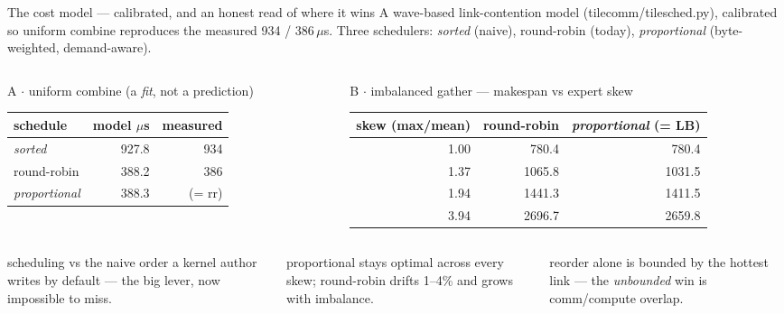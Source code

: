 \documentclass[pdf,aspectratio=169]{beamer}
\newcommand{\empy}[1]{{\color{darkorange}\emph{#1}}}
\newcommand{\empr}[1]{{\color{cardinalred}\emph{#1}}}
\newcommand{\examplebox}[2]{%
\begin{tcolorbox}[colframe=darkcardinal,colback=boxgray,title={#1}]
#2
\end{tcolorbox}}
\newcommand{\mc}[1]{{\ttfamily\small #1}}
\begin{document}
\begin{frame}{The cost model --- calibrated, and an honest read of where it wins}
\footnotesize
A wave-based link-contention model (\mc{tilecomm/tilesched.py}), calibrated so uniform combine reproduces the measured 934 / 386\,$\mu$s. Three schedulers: \empr{sorted} (naive), round-robin (today), \empy{proportional} (byte-weighted, demand-aware).
\begin{columns}
\begin{column}{0.45\textwidth}
\centering\scriptsize A $\cdot$ uniform combine (a \emph{fit}, not a prediction)
\begin{tabular}{lrr}
\toprule
schedule & model $\mu$s & measured \\
\midrule
\empr{sorted} & 927.8 & 934 \\
round-robin & 388.2 & 386 \\
\empy{proportional} & 388.3 & (= rr) \\
\bottomrule
\end{tabular}
\end{column}
\begin{column}{0.55\textwidth}
\centering\scriptsize B $\cdot$ imbalanced gather --- makespan vs expert skew
\begin{tabular}{rrr}
\toprule
skew (max/mean) & round-robin & \empy{proportional} (= LB) \\
\midrule
1.00 & 780.4 & 780.4 \\
1.37 & 1065.8 & 1031.5 \\
1.94 & 1441.3 & 1411.5 \\
3.94 & 2696.7 & 2659.8 \\
\bottomrule
\end{tabular}
\end{column}
\end{columns}
\vspace{0.5ex}
\begin{columns}
\begin{column}{0.33\textwidth}
\examplebox{2.4--6$\times$}{\scriptsize scheduling vs the naive order a kernel author writes by default --- the big lever, now impossible to miss.}
\end{column}
\begin{column}{0.33\textwidth}
\examplebox{= lower bound}{\scriptsize proportional stays optimal across every skew; round-robin drifts 1--4\% and grows with imbalance.}
\end{column}
\begin{column}{0.33\textwidth}
\examplebox{honest cap}{\scriptsize reorder alone is bounded by the hottest link --- the \emph{unbounded} win is comm/compute overlap.}
\end{column}
\end{columns}
\end{frame}
\end{document}
